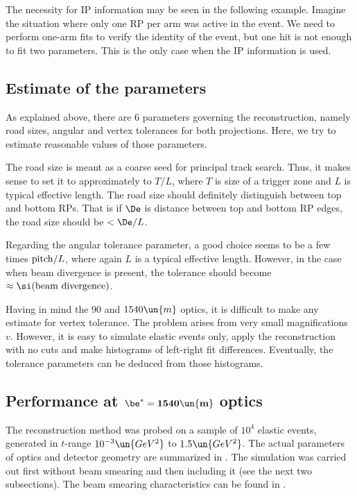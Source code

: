 The necessity for IP information may be seen in the following example. Imagine the situation where only one RP per arm was active in the event. We need to perform one-arm fits to verify the identity of the event, but one hit is not enough to fit two parameters. This is the only case when the IP information is used.

\subsection[estim]{Estimate of the parameters}

As explained above, there are 6 parameters governing the reconstruction, namely road sizes, angular and vertex tolerances for both projections. Here, we try to estimate reasonable values of those parameters.

The road size is meant as a coarse seed for principal track search. Thus, it makes sense to set it to approximately to $T/L$, where $T$ is size of a trigger zone and $L$ is typical effective length. The road size should definitely distinguish between top and bottom RPs. That is if $\De$ is distance between top and bottom RP edges, the road size should be $< \De / L$.

Regarding the angular tolerance parameter, a good choice seems to be a few times ${\rm pitch}/L$, where again $L$ is a typical effective length. However, in the case when beam divergence is present, the tolerance should become $\approx \si({\rm beam\ divergence})$.

Having in mind the $90$ and $1540\un{m}$ optics, it is difficult to make any estimate for vertex tolerance. The problem arises from very small magnifications $v$. However, it is easy to simulate elastic events only, apply the reconstruction with no cuts and make histograms of left-right fit differences. Eventually, the tolerance parameters can be deduced from those histograms.


\subsection[1540]{Performance at $\mathbf{\be^*=1540\un{m}}$ optics}

The reconstruction method was probed on a sample of $10^4$ elastic events, generated in $t$-range $10^{-3}\un{GeV^2}$ to $1.5\un{GeV^2}$. The actual parameters of optics and detector geometry are summarized in . The simulation was carried out first without beam smearing and then including it (see the next two subsections). The beam smearing characteristics can be found in .

